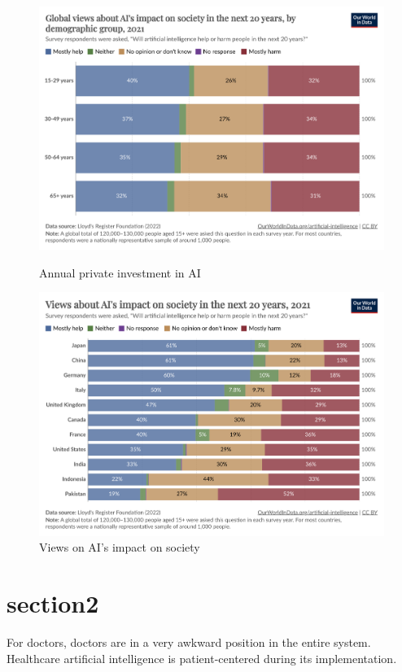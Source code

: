 \documentclass[paper=a4, fontsize=11pt]{scrartcl} %
\numberwithin{equation}{section} %
\numberwithin{figure}{section} %
\numberwithin{table}{section} %
\begin{document}
\begin{figure}[htbp]
    \centering
    \begin{minipage}[t]{0.48\linewidth}
        \includegraphics[width=\linewidth]{./data/influence_by_ages.png}
        \caption{Annual private investment in AI}
        \label{fig:investment}
    \end{minipage}\hfill
    \begin{minipage}[t]{0.48\linewidth}
        \includegraphics[width=\linewidth]{./data/influence.png}
        \caption{Views on AI's impact on society}
        \label{fig:views_ai_impact}
    \end{minipage}
\end{figure}


\section{section2}
For doctors, doctors are in a very awkward position in the entire system. Healthcare artificial intelligence is patient-centered during its implementation.
\end{document}
